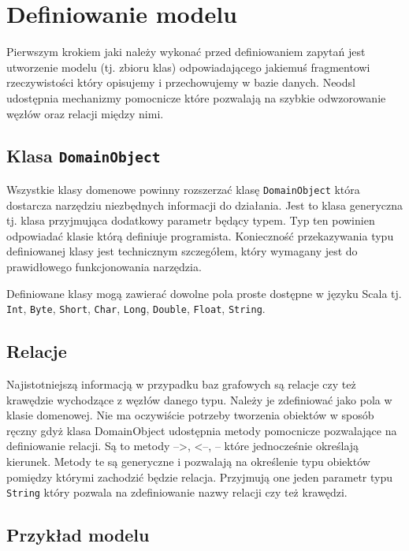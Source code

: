 \documentclass[brudnopis]{xmgr}
\begin{document}
\section{Definiowanie modelu}

Pierwszym krokiem jaki należy wykonać przed definiowaniem zapytań jest utworzenie modelu (tj. zbioru klas) odpowiadającego jakiemuś fragmentowi rzeczywistości który opisujemy i przechowujemy w bazie danych. Neodsl udostępnia mechanizmy pomocnicze które pozwalają na szybkie odwzorowanie węzłów oraz relacji między nimi.

\subsection{Klasa \texttt{DomainObject}}

Wszystkie klasy domenowe powinny rozszerzać klasę \texttt{DomainObject} która dostarcza narzędziu niezbędnych informacji do działania. Jest to klasa generyczna tj. klasa przyjmująca dodatkowy parametr będący typem. Typ ten powinien odpowiadać klasie którą definiuje programista. Konieczność przekazywania typu definiowanej klasy jest technicznym szczegółem, który wymagany jest do prawidłowego funkcjonowania narzędzia.

Definiowane klasy mogą zawierać dowolne pola proste dostępne w języku Scala tj. \texttt{Int}, \texttt{Byte}, \texttt{Short}, \texttt{Char}, \texttt{Long}, \texttt{Double}, \texttt{Float}, \texttt{String}.

\subsection{Relacje}

Najistotniejszą informacją w przypadku baz grafowych są relacje czy też krawędzie wychodzące z węzłów danego typu. Należy je zdefiniować jako pola w klasie domenowej. Nie ma oczywiście potrzeby tworzenia obiektów w sposób ręczny gdyż klasa DomainObject udostępnia metody pomocnicze pozwalające na definiowanie relacji. Są to metody  -->, <--, -- które jednocześnie określają kierunek. Metody te są generyczne i pozwalają na określenie typu obiektów pomiędzy którymi zachodzić będzie relacja. Przyjmują one jeden parametr typu \texttt{String} który pozwala na zdefiniowanie nazwy relacji czy też krawędzi.

\subsection{Przykład modelu}
\end{document}
